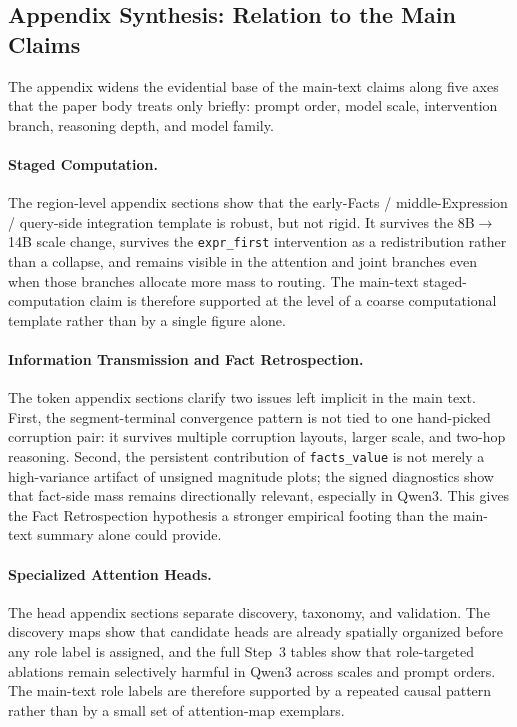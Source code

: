 \documentclass[11pt]{article}
\begin{document}


\subsection{Appendix Synthesis: Relation to the Main Claims}
\label{sec:appendix_synthesis}
The appendix widens the evidential base of the main-text claims along five axes that the paper body treats only briefly: prompt order, model scale, intervention branch, reasoning depth, and model family.

\paragraph{Staged Computation.}
The region-level appendix sections show that the early-Facts / middle-Expression / query-side integration template is robust, but not rigid. It survives the 8B$\rightarrow$14B scale change, survives the \texttt{expr\_first} intervention as a redistribution rather than a collapse, and remains visible in the attention and joint branches even when those branches allocate more mass to routing. The main-text staged-computation claim is therefore supported at the level of a coarse computational template rather than by a single figure alone.

\paragraph{Information Transmission and Fact Retrospection.}
The token appendix sections clarify two issues left implicit in the main text. First, the segment-terminal convergence pattern is not tied to one hand-picked corruption pair: it survives multiple corruption layouts, larger scale, and two-hop reasoning. Second, the persistent contribution of \texttt{facts\_value} is not merely a high-variance artifact of unsigned magnitude plots; the signed diagnostics show that fact-side mass remains directionally relevant, especially in Qwen3. This gives the Fact Retrospection hypothesis a stronger empirical footing than the main-text summary alone could provide.

\paragraph{Specialized Attention Heads.}
The head appendix sections separate discovery, taxonomy, and validation. The discovery maps show that candidate heads are already spatially organized before any role label is assigned, and the full Step~3 tables show that role-targeted ablations remain selectively harmful in Qwen3 across scales and prompt orders. The main-text role labels are therefore supported by a repeated causal pattern rather than by a small set of attention-map exemplars.
\end{document}
